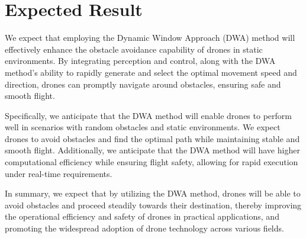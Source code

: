 \documentclass[crop=false]{standalone}
\begin{document}
	\section{Expected Result}
	We expect that employing the Dynamic Window Approach (DWA) method will effectively enhance the obstacle avoidance capability of drones in static environments. By integrating perception and control, along with the DWA method's ability to rapidly generate and select the optimal movement speed and direction, drones can promptly navigate around obstacles, ensuring safe and smooth flight.
	
	Specifically, we anticipate that the DWA method will enable drones to perform well in scenarios with random obstacles and static environments. We expect drones to avoid obstacles and find the optimal path while maintaining stable and smooth flight. Additionally, we anticipate that the DWA method will have higher computational efficiency while ensuring flight safety, allowing for rapid execution under real-time requirements.
	
	In summary, we expect that by utilizing the DWA method, drones will be able to avoid obstacles and proceed steadily towards their destination, thereby improving the operational efficiency and safety of drones in practical applications, and promoting the widespread adoption of drone technology across various fields.
\end{document}
